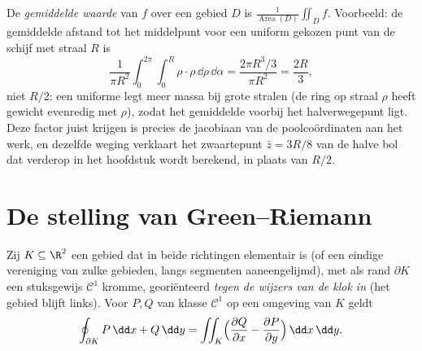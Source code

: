\begin{example}\label{ex:b2:multint:average}
De \emph{gemiddelde waarde} van $f$ over een gebied $D$ is
$\frac1{\operatorname{Area}(D)}\iint_Df$. Voorbeeld: de gemiddelde
afstand tot het middelpunt voor een uniform gekozen punt van de
schijf met straal $R$ is
\[
\frac{1}{\pi R^2}\int_0^{2\pi}\!\!\int_0^R
\rho\cdot\rho\,\dd\rho\,\dd\alpha
= \frac{2\pi R^3/3}{\pi R^2} = \frac{2R}3 ,
\]
niet $R/2$: een uniforme  legt meer massa bij grote
stralen (de ring op straal $\rho$ heeft gewicht evenredig met
$\rho$), zodat het gemiddelde voorbij het halverwegepunt ligt. Deze
factor juist krijgen is precies de jacobiaan van de poolcoördinaten
aan het werk, en dezelfde weging verklaart het zwaartepunt $\bar z
= 3R/8$ van de halve bol dat verderop in het hoofdstuk wordt
berekend, in plaats van $R/2$.
\end{example}

\section{De stelling van Green--Riemann}

\begin{theorem}\label{thm:b2:multint:green}
Zij $K \subseteq \R^2$ een  gebied dat in beide richtingen
elementair is (of een eindige vereniging van zulke gebieden, langs
segmenten aaneengelijmd), met als rand $\partial K$ een
stuksgewijs $\mathcal{C}^1$  kromme, georiënteerd
\emph{tegen de wijzers van de klok in} (het gebied blijft links).
Voor $P, Q$ van klasse $\mathcal{C}^1$ op een omgeving van $K$
geldt
\[
\oint_{\partial K} P\,\dd x + Q\,\dd y
= \iint_K \Bigl(\frac{\partial Q}{\partial x}
- \frac{\partial P}{\partial y}\Bigr)\,\dd x\,\dd y .
\]
\end{theorem}

